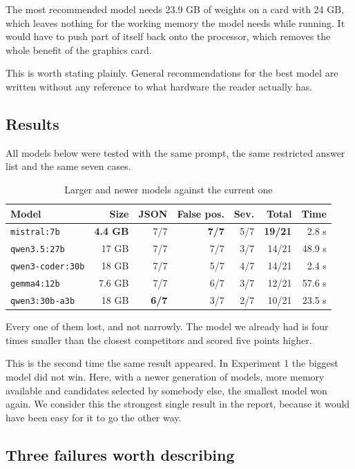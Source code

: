 \documentclass[11pt,a4paper]{article}
\newcommand{\best}[1]{\textbf{#1}}
\begin{document}
The most recommended model needs 23.9 GB of weights on a card with 24 GB, which
leaves nothing for the working memory the model needs while running. It would have to
push part of itself back onto the processor, which removes the whole benefit of the
graphics card.

This is worth stating plainly. General recommendations for the best model are written
without any reference to what hardware the reader actually has.

\subsection{Results}

All models below were tested with the same prompt, the same restricted answer list
and the same seven cases.

\begin{table}[h]
\centering
\small
\caption{Larger and newer models against the current one}
\begin{tabular}{@{}lrrrrrr@{}}
\toprule
\textbf{Model} & \textbf{Size} & \textbf{JSON} & \textbf{False pos.}
  & \textbf{Sev.} & \textbf{Total} & \textbf{Time} \\
\midrule
\texttt{mistral:7b}      & \best{4.4 GB} & 7/7 & \best{7/7} & 5/7 & \best{19/21} & 2.8 s \\
\texttt{qwen3.5:27b}     & 17 GB  & 7/7 & 7/7 & 3/7 & 14/21 & 48.9 s \\
\texttt{qwen3-coder:30b} & 18 GB  & 7/7 & 5/7 & 4/7 & 14/21 & 2.4 s \\
\texttt{gemma4:12b}      & 7.6 GB & 7/7 & 6/7 & 3/7 & 12/21 & 57.6 s \\
\texttt{qwen3:30b-a3b}   & 18 GB  & \best{6/7} & 3/7 & 2/7 & 10/21 & 23.5 s \\
\bottomrule
\end{tabular}
\end{table}

Every one of them lost, and not narrowly. The model we already had is four times
smaller than the closest competitors and scored five points higher.

This is the second time the same result appeared. In Experiment 1 the biggest model
did not win. Here, with a newer generation of models, more memory available and
candidates selected by somebody else, the smallest model won again. We consider this
the strongest single result in the report, because it would have been easy for it to
go the other way.

\subsection{Three failures worth describing}
\end{document}
